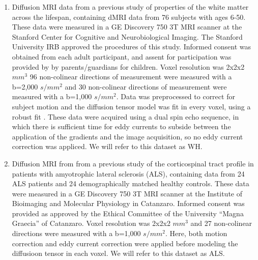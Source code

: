 \begin{enumerate}

\item Diffusion MRI data from a previous study of properties of the white matter
across the lifespan\cite{yeatman2014lifespan}, containing dMRI data from 76
subjects with ages 6-50. These data were measured in a GE Discovery 750 3T MRI
scanner at the Stanford Center for Cognitive and Neurobiological Imaging. The
Stanford University IRB approved the procedures of this study. Informed consent
was obtained from each adult participant, and assent for participation was
provided by by parents/guardians for children. Voxel resolution was 2x2x2 $mm^3$
96 non-colinear directions of measurement were measured with a b=2,000 $s/mm^2$
and 30 non-colinear directions of measurement were measured with a b=1,000
$s/mm^2$. Data was preprocessed to correct for subject motion and the diffusion
tensor model \cite{basser1994mr} was fit in every voxel, using a robust fit
\cite{chang2005restore}. These data were acquired using a dual spin echo
sequence, in which there is sufficient time for eddy currents to subside between
the application of the gradients and the image acquisition, so no eddy current
correction was appliced. We will refer to this dataset as WH.

\item Diffusion MRI from from a previous study of the corticospinal tract
profile in patients with amyotrophic lateral sclerosis
(ALS)\cite{sarica2017corticospinal}, containing data from 24 ALS patients and 24
demographically matched healthy controls. These data were measured in a GE
Discovery 750 3T MRI scanner at the Institute of Bioimaging and Molecular
Physiology in Catanzaro. Informed consent was provided as approved by the
Ethical Committee of the University ``Magna Graecia'' of Catanzaro. Voxel
resolution was 2x2x2 $mm^3$ and 27 non-colinear directions were measured with a
b=1,000 $s/mm^2$. Here, both motion correction and eddy current correction were
applied before modeling the diffusioon tensor in each voxel. We will refer to
this dataset as ALS.

\end{enumerate}

